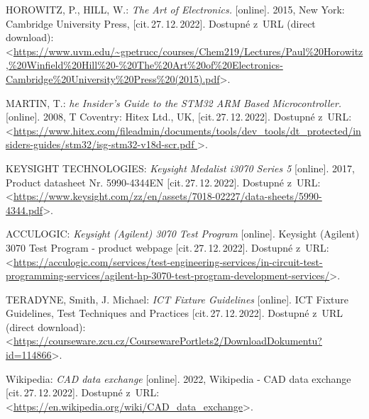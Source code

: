 

\begin{thebibliography}{99}

    HOROWITZ, P., HILL, W.:
    \emph{The Art of Electronics.}\/ [online].
    2015, New York: Cambridge University Press, [cit.\,27.\,12.\,2022].
    Dostupné z~URL (direct download):\\
    <\url{https://www.uvm.edu/~gpetrucc/courses/Chem219/Lectures/Paul%20Horowitz,%20Winfield%20Hill%20-%20The%20Art%20of%20Electronics-Cambridge%20University%20Press%20(2015).pdf}>.

    MARTIN, T.:
    \emph{he Insider's Guide to the STM32 ARM Based Microcontroller.}\/ [online].
    2008, T Coventry: Hitex Ltd., UK, [cit.\,27.\,12.\,2022].
    Dostupné z~URL:\\
    <\url{https://www.hitex.com/fileadmin/documents/tools/dev_tools/dt_protected/insiders-guides/stm32/isg-stm32-v18d-scr.pdf
    }>.

    KEYSIGHT TECHNOLOGIES:
    \emph{Keysight Medalist i3070 Series 5}\/ [online].
		2017, Product datasheet Nr. 5990-4344EN [cit.\,27.\,12.\,2022].
    Dostupné z~URL:\\
    <\url{https://www.keysight.com/zz/en/assets/7018-02227/data-sheets/5990-4344.pdf}>.

    
    ACCULOGIC:
    \emph{Keysight (Agilent) 3070 Test Program}\/ [online].
    Keysight (Agilent) 3070 Test Program - product webpage [cit.\,27.\,12.\,2022].
    Dostupné z~URL:\\
    <\url{https://acculogic.com/services/test-engineering-services/in-circuit-test-programming-services/agilent-hp-3070-test-program-development-services/}>.


    TERADYNE, Smith, J. Michael:
    \emph{ICT Fixture Guidelines}\/ [online].
    ICT Fixture Guidelines, Test Techniques and Practices [cit.\,27.\,12.\,2022].
    Dostupné z~URL (direct download):\\
    <\url{https://courseware.zcu.cz/CoursewarePortlets2/DownloadDokumentu?id=114866}>.

    Wikipedia:
    \emph{CAD data exchange}\/ [online].
    2022, Wikipedia - CAD data exchange [cit.\,27.\,12.\,2022].
    Dostupné z~URL:\\
    <\url{https://en.wikipedia.org/wiki/CAD_data_exchange}>.


\end{thebibliography}
